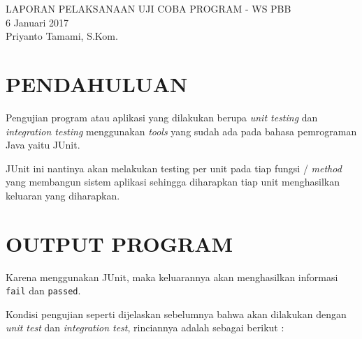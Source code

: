 \documentclass[pdftex,12pt, oneside]{article}
\begin{document}
\sloppy %

\begin{center}
{\large LAPORAN PELAKSANAAN UJI COBA PROGRAM - WS PBB}
\\[1cm]
6 Januari 2017\\
Priyanto Tamami, S.Kom.
\end{center}




\section{PENDAHULUAN}

Pengujian program atau aplikasi yang dilakukan berupa \textit{unit testing} dan \textit{integration testing} menggunakan \textit{tools} yang sudah ada pada bahasa pemrograman Java yaitu JUnit.

JUnit ini nantinya akan melakukan testing per unit pada tiap fungsi / \textit{method} yang membangun sistem aplikasi sehingga diharapkan tiap unit menghasilkan keluaran yang diharapkan.

\section{OUTPUT PROGRAM}

Karena menggunakan JUnit, maka keluarannya akan menghasilkan informasi \texttt{fail} dan \texttt{passed}.

Kondisi pengujian seperti dijelaskan sebelumnya bahwa akan dilakukan dengan \textit{unit test} dan \textit{integration test}, rinciannya adalah sebagai berikut :
\end{document}
